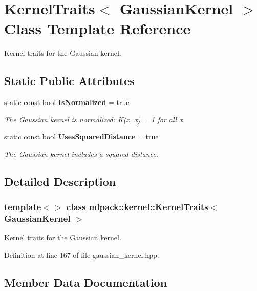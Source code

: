 \section{Kernel\+Traits$<$ Gaussian\+Kernel $>$ Class Template Reference}
\label{classmlpack_1_1kernel_1_1KernelTraits_3_01GaussianKernel_01_4}


Kernel traits for the Gaussian kernel.  


\subsection*{Static Public Attributes}
\begin{DoxyCompactItemize}
\item 
static const bool \textbf{ Is\+Normalized} = true
\begin{DoxyCompactList}\small\item\em The Gaussian kernel is normalized\+: K(x, x) = 1 for all x. \end{DoxyCompactList}\item 
static const bool \textbf{ Uses\+Squared\+Distance} = true
\begin{DoxyCompactList}\small\item\em The Gaussian kernel includes a squared distance. \end{DoxyCompactList}\end{DoxyCompactItemize}


\subsection{Detailed Description}
\subsubsection*{template$<$$>$\newline
class mlpack\+::kernel\+::\+Kernel\+Traits$<$ Gaussian\+Kernel $>$}

Kernel traits for the Gaussian kernel. 

Definition at line 167 of file gaussian\+\_\+kernel.\+hpp.



\subsection{Member Data Documentation}
\mbox{\label{classmlpack_1_1kernel_1_1KernelTraits_3_01GaussianKernel_01_4_a213c74e1e7c01890b64c8b9e88f8c0dc}} 
